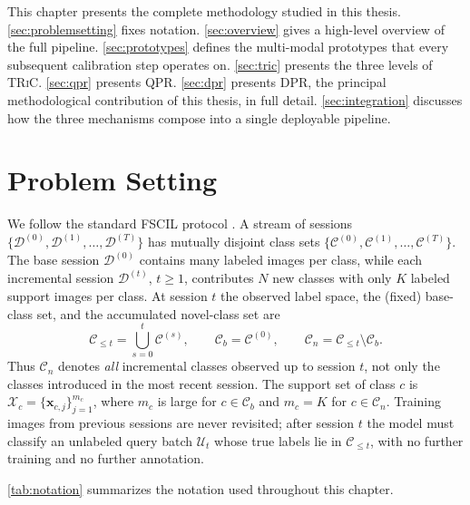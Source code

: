 \documentclass{iutbscthesis}
\begin{document}
This chapter presents the complete methodology studied in this thesis. \autoref{sec:problemsetting} fixes notation. \autoref{sec:overview} gives a high-level overview of the full pipeline. \autoref{sec:prototypes} defines the multi-modal prototypes that every subsequent calibration step operates on. \autoref{sec:tric} presents the three levels of \textsc{TRiC}. \autoref{sec:qpr} presents QPR. \autoref{sec:dpr} presents DPR, the principal methodological contribution of this thesis, in full detail. \autoref{sec:integration} discusses how the three mechanisms compose into a single deployable pipeline.

\section{Problem Setting}
\label{sec:problemsetting}

We follow the standard FSCIL protocol \autocite{tao2020fewshot}. A stream of sessions $\{\mathcal{D}^{(0)}, \mathcal{D}^{(1)}, \dots, \mathcal{D}^{(T)}\}$ has mutually disjoint class sets $\{\mathcal{C}^{(0)}, \mathcal{C}^{(1)}, \dots, \mathcal{C}^{(T)}\}$. The base session $\mathcal{D}^{(0)}$ contains many labeled images per class, while each incremental session $\mathcal{D}^{(t)}$, $t \ge 1$, contributes $N$ new classes with only $K$ labeled support images per class. At session $t$ the observed label space, the (fixed) base-class set, and the accumulated novel-class set are
\begin{equation}
    \mathcal{C}_{\le t} = \bigcup_{s=0}^{t} \mathcal{C}^{(s)}, \qquad
    \mathcal{C}_b = \mathcal{C}^{(0)}, \qquad
    \mathcal{C}_n = \mathcal{C}_{\le t} \setminus \mathcal{C}_b .
    \label{eq:classsets}
\end{equation}
Thus $\mathcal{C}_n$ denotes \emph{all} incremental classes observed up to session $t$, not only the classes introduced in the most recent session. The support set of class $c$ is $\mathcal{X}_c = \{\mathbf{x}_{c,j}\}_{j=1}^{m_c}$, where $m_c$ is large for $c \in \mathcal{C}_b$ and $m_c = K$ for $c \in \mathcal{C}_n$. Training images from previous sessions are never revisited; after session $t$ the model must classify an unlabeled query batch $\mathcal{U}_t$ whose true labels lie in $\mathcal{C}_{\le t}$, with no further training and no further annotation.

\autoref{tab:notation} summarizes the notation used throughout this chapter.
\end{document}

